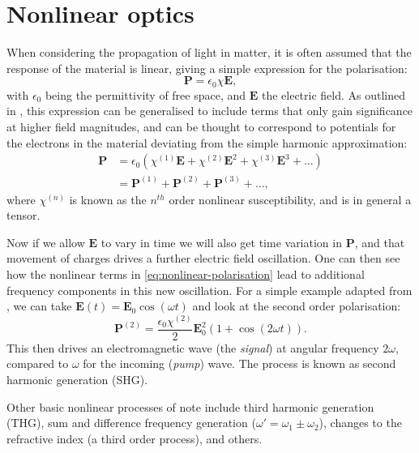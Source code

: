\documentclass[12pt,a4paper]{article}
\begin{document}
\section{Nonlinear optics}
When considering the propagation of light in matter, it is often assumed that the response of the material is linear\cite{jacksonClassicalElectrodynamics1999}, giving a simple expression for the polarisation:
\begin{equation}
	\label{eq:linear-polarisation}
	\bm{P}=\epsilon_0\chi\bm{E},
\end{equation}
with $\epsilon_0$ being the permittivity of free space, and $\bm{E}$ the electric field. As outlined in \cite{boydNonlinearOptics2008}, this expression can be generalised to include terms that only gain significance at higher field magnitudes, and can be thought to correspond to potentials for the electrons in the material deviating from the simple harmonic approximation:
\begin{align}
	\label{eq:nonlinear-polarisation}
	\bm{P}&=\epsilon_0(\chi^{(1)}\bm{E}+\chi^{(2)}\bm{E}^2+\chi^{(3)}\bm{E}^3+...)\\
	&=\bm{P}^{(1)}+\bm{P}^{(2)}+\bm{P}^{(3)}+...,
\end{align}
where $\chi^{(n)}$ is known as the $n^{th}$ order nonlinear susceptibility, and is in general a tensor.

Now if we allow $\bm{E}$ to vary in time we will also get time variation in $\bm{P}$, and that movement of charges drives a further electric field oscillation. One can then see how the nonlinear terms in \eqref{eq:nonlinear-polarisation} lead to additional frequency components in this new oscillation. For a simple example adapted from \cite{boydNonlinearOptics2008}, we can take $\bm{E}(t)=\bm{E}_0\cos(\omega t)$ and look at the second order polarisation:
\begin{equation}
	\label{eq:example-polarisation}
	\bm{P}^{(2)}=\frac{\epsilon_0\chi^{(2)}}{2}\bm{E}_0^2\left(1+\cos(2\omega t)\right).
\end{equation}
This then drives an electromagnetic wave (the \emph{signal}) at angular frequency $2\omega$, compared to $\omega$ for the incoming (\emph{pump}) wave. The process is known as second harmonic generation (SHG).

Other basic nonlinear processes of note include third harmonic generation (THG), sum and difference frequency generation ($\omega'=\omega_1\pm\omega_2$), changes to the refractive index (a third order process), and others\cite{boydNonlinearOptics2008}.
\end{document}
